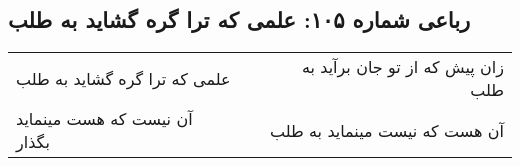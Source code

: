 \begin{center}
\section*{رباعی شماره ۱۰۵: علمی که ترا گره گشاید به طلب}
\label{sec:0105}
\begin{longtable}{l p{0.5cm} r}
علمی که ترا گره گشاید به طلب
&&
زان پیش که از تو جان برآید به طلب
\\
آن نیست که هست مینماید بگذار
&&
آن هست که نیست مینماید به طلب
\\
\end{longtable}
\end{center}
